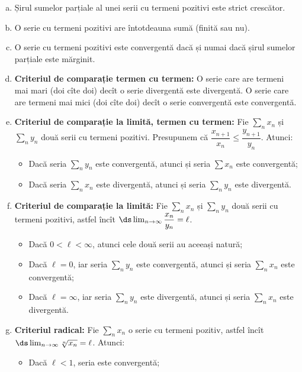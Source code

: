 \begin{enumerate}[(a)]
\item Șirul sumelor parțiale al unei serii cu termeni pozitivi este
  strict crescător.
\item O serie cu termeni pozitivi are întotdeauna sumă (finită sau nu).
\item O serie cu termeni pozitivi este convergentă dacă și numai dacă
  șirul sumelor parțiale este mărginit.
\item \textbf{Criteriul de comparație termen cu termen:} O serie care are termeni
  mai mari (doi cîte doi) decît o serie divergentă este divergentă.
  O serie care are termeni mai mici (doi cîte doi) decît o serie convergentă
  este convergentă. 
\item \textbf{Criteriul de comparație la limită, termen cu termen:}
  Fie $ \sum_n x_n $ și
  $ \sum_n y_n $ două serii cu termeni pozitivi. Presupunem că
  $ \dfrac{x_{n+1}}{x_n} \leq \dfrac{y_{n+1}}{y_n} $. Atunci:
  \begin{itemize}
  \item Dacă seria $ \sum_n y_n $ este convergentă, atunci și seria
    $ \sum x_n $ este convergentă;
  \item Dacă seria $ \sum_n x_n $ este divergentă, atunci și seria
    $ \sum_n y_n $ este divergentă.
  \end{itemize}
\item \textbf{Criteriul de comparație la limită:} Fie $ \sum_n x_n $ și
  $ \sum_n y_n $ două serii cu termeni pozitivi, astfel încît
  $ \ds\lim_{n \to \infty} \dfrac{x_n}{y_n} = \ell $.
  \begin{itemize}
  \item Dacă $ 0 < \ell < \infty $, atunci cele două serii au aceeași natură;
  \item Dacă $ \ell = 0 $, iar seria $ \sum_n y_n $ este convergentă, atunci și
    seria $ \sum_n x_n $ este convergentă;
  \item Dacă $ \ell = \infty $, iar seria $ \sum_n y_n $ este divergentă, atunci
    și seria $ \sum_n x_n $ este divergentă.
  \end{itemize}
\item \textbf{Criteriul radical:} Fie $ \sum_n x_n $ o serie cu
  termeni pozitiv, astfel încît $ \ds\lim_{n \to \infty} \sqrt[n]{x_n} = \ell $.
  Atunci:
  \begin{itemize}
  \item Dacă $ \ell < 1 $, seria este convergentă;

\end{itemize}
\end{enumerate}
